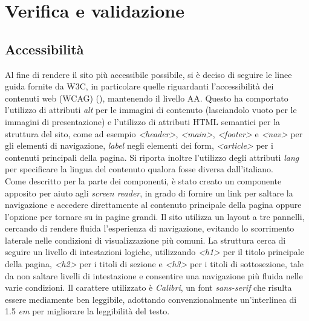 \chapter{Verifica e validazione}\label{cap:verifica-validazione}


\section{Accessibilità}\label{sec:verifica-validazione-accessibilita}

Al fine di rendere il sito più accessibile possibile, si è deciso di seguire le linee guida fornite da W3C, in particolare quelle riguardanti l'accessibilità dei contenuti web (WCAG) (\cite{site:wcag}), mantenendo il livello AA.\@
Questo ha comportato l'utilizzo di attributi \textit{alt} per le immagini di contenuto (lasciandolo vuoto per le immagini di presentazione) e l'utilizzo di attributi HTML semantici per la struttura del sito, come 
ad esempio \textit{<header>}, \textit{<main>}, \textit{<footer>} e \textit{<nav>} per gli elementi di navigazione, \textit{label} negli elementi dei form, \textit{<article>} per i contenuti principali della pagina.
Si riporta inoltre l'utilizzo degli attributi \textit{lang} per specificare la lingua del contenuto qualora fosse diversa dall'italiano. \\

Come descritto per la parte dei componenti, è stato creato un componente apposito per aiuto agli \textit{screen reader}, in grado di fornire un link per saltare la navigazione e accedere direttamente al contenuto principale della pagina
oppure l'opzione per tornare su in pagine grandi.
Il sito utilizza un layout a tre pannelli, cercando di rendere fluida l'esperienza di navigazione, evitando lo scorrimento laterale nelle condizioni di visualizzazione più comuni.
La struttura cerca di seguire un livello di intestazioni logiche, utilizzando \textit{<h1>} per il titolo principale della pagina, \textit{<h2>} per i titoli di sezione e \textit{<h3>} per i titoli di sottosezione,
tale da non saltare livelli di intestazione e consentire una navigazione più fluida nelle varie condizioni.
Il carattere utilizzato è \textit{Calibri}, un font \textit{sans-serif} che risulta essere mediamente ben leggibile, adottando convenzionalmente un'interlinea di 1.5 \textit{em} per migliorare la leggibilità del testo. \\

